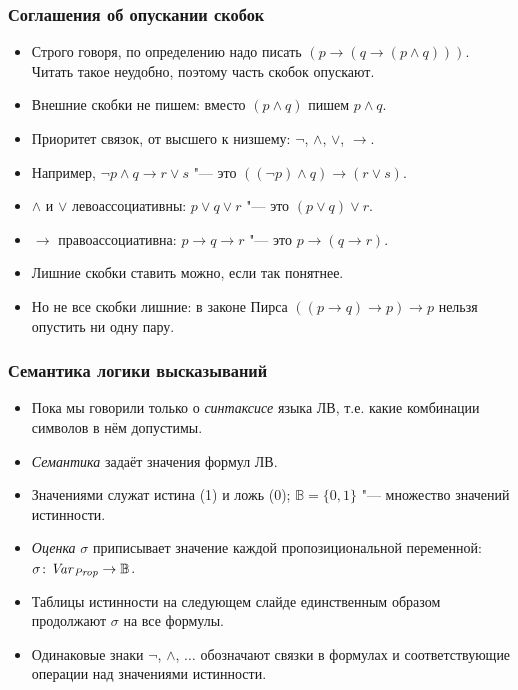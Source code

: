 \documentclass[10pt]{beamer}
\begin{document}
\begin{frame}
    \frametitle{Соглашения об опускании скобок}
    \begin{itemize}
        \item Строго говоря, по определению надо писать $(p \to (q \to (p \land q)))$. Читать такое неудобно, поэтому часть скобок опускают.
        \pause
        \item Внешние скобки не пишем: вместо $(p \land q)$ пишем $p \land q$.
        \pause
        \item Приоритет связок, от высшего к низшему: $\neg$, $\land$, $\lor$, $\to$.
        \item Например, $\neg p \land q \to r \lor s$ "--- это $((\neg p) \land q) \to (r \lor s)$.
        \pause
        \item $\land$ и $\lor$ левоассоциативны: $p \lor q \lor r$ "--- это $(p \lor q) \lor r$.
        \item $\to$ правоассоциативна: $p \to q \to r$ "--- это $p \to (q \to r)$.
        \pause
        \item Лишние скобки ставить можно, если так понятнее.
        \item Но не все скобки лишние: в законе Пирса $((p \to q) \to p) \to p$ нельзя опустить ни одну пару.
    \end{itemize}
\end{frame}

\begin{frame}
    \frametitle{Семантика логики высказываний}
    \begin{itemize}
        \item Пока мы говорили только о \emph{синтаксисе} языка ЛВ, т.е. какие комбинации символов в нём допустимы.
        \item \emph{Семантика} задаёт значения формул ЛВ.
        \item Значениями служат истина (1) и ложь (0); $\mathbb{B} = \{0, 1\}$ "--- множество значений истинности.
        \item \emph{Оценка} $\sigma$ приписывает значение каждой пропозициональной переменной: $\sigma\colon \mathit{Var}_{\mathit{Prop}} \to \mathbb{B}$.
        \item Таблицы истинности на следующем слайде единственным образом продолжают $\sigma$ на все формулы.
        \item Одинаковые знаки $\neg$, $\land$, $\ldots$ обозначают связки в формулах и соответствующие операции над значениями истинности.
    \end{itemize}
\end{frame}
\end{document}
